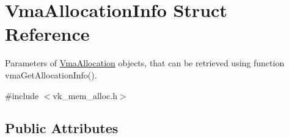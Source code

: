\hypertarget{structVmaAllocationInfo}{}\section{Vma\+Allocation\+Info Struct Reference}
\label{structVmaAllocationInfo}


Parameters of \hyperlink{structVmaAllocation}{Vma\+Allocation} objects, that can be retrieved using function vma\+Get\+Allocation\+Info().  




{\ttfamily \#include $<$vk\+\_\+mem\+\_\+alloc.\+h$>$}

\subsection*{Public Attributes}
